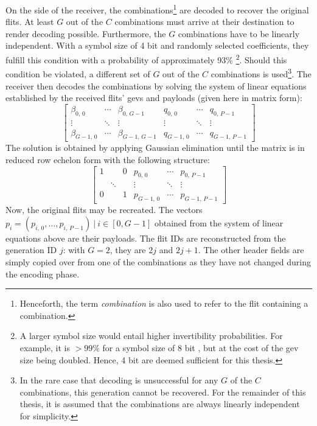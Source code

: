 On the side of the receiver, the combinations\footnote{Henceforth, the term \textit{combination} is also used to refer to the flit containing a
combination.} are decoded to recover the original flits. At least $G$ out of the $C$ combinations must arrive at their
destination to render decoding possible. Furthermore, the $G$ combinations have to be linearly independent. With a symbol size of 4 bit and randomly
selected coefficients, they fulfill this condition with a probability of approximately 93\% \cite[4]{franz18authdraft}\footnote{A larger symbol size would
entail higher invertibility probabilities. For example, it is $>99\%$ for a symbol size of 8 bit \cite[4]{franz18authdraft}, but at the cost of the
\gls{gev} size being doubled. Hence, 4 bit are deemed sufficient for this thesis.}. Should this condition be violated, a different set of $G$ out of
the $C$ combinations is used\footnote{In the rare case that decoding is unsuccessful for any $G$ of the $C$ combinations, this generation cannot be
recovered. For the remainder of this thesis, it is assumed that the combinations are always linearly independent for simplicity.}. The receiver then
decodes the combinations by solving the system of linear equations established by the received flits' \glspl{gev} and payloads (given here in matrix
form):
\[
    \begin{bmatrix}
        \beta_{0,\,0} & \cdots & \beta_{0,\,G-1} & q_{0,\,0} & \cdots & q_{0,\,P-1} \\
        \vdots & \ddots & \vdots & \vdots & \ddots & \vdots \\
        \beta_{G-1,\,0} & \cdots & \beta_{G-1,\,G-1} & q_{G-1,\,0} & \cdots & q_{G-1,\,P-1}
    \end{bmatrix}
\]
The solution is obtained by applying Gaussian elimination until the matrix is in reduced row echelon form with the following structure:
\[
    \begin{bmatrix}
        1 & & 0 & p_{0,\,0} & \cdots & p_{0,\,P-1} \\
        & \ddots & & \vdots & \ddots & \vdots \\
        0 & & 1 & p_{G-1,\,0} & \cdots & p_{G-1,\,P-1}
    \end{bmatrix}
\]
Now, the original flits may be recreated. The vectors $p_i = (p_{i,\,0}, …, p_{i,\,P-1})\ |\ i \in [0, G-1]$ obtained from the system of linear
equations above are their payloads. The flit IDs are reconstructed from the generation ID $j$: with $G = 2$, they are $2j$ and $2j+1$. The other
header fields are simply copied over from one of the combinations as they have not changed during the encoding phase.

